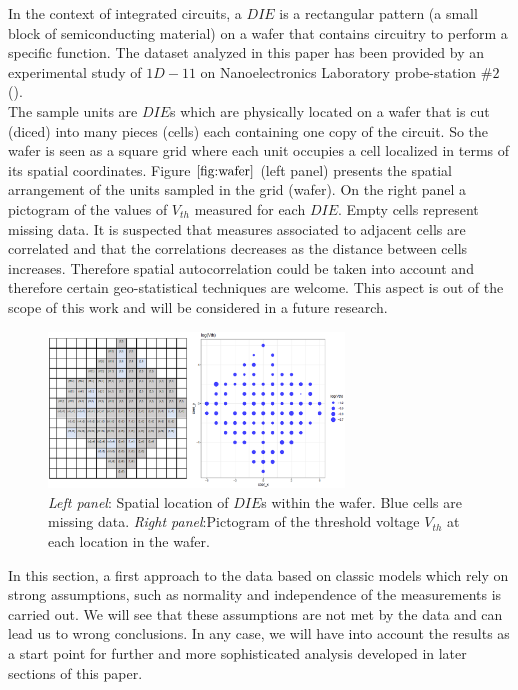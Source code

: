 \documentclass[sn-mathphys]{sn-jnl}%
\theoremstyle{thmstyleone}%
\theoremstyle{thmstyletwo}%
\theoremstyle{thmstylethree}%
\begin{document}
In the context of integrated circuits, a $DIE$ is a rectangular pattern (a small block of semiconducting material) on a wafer that contains circuitry to perform a specific function.  
The dataset analyzed in this paper has been provided by an experimental study of { } {$1D-11$} on Nanoelectronics Laboratory probe-station $\# 2$ ({}). \\
The sample units are $DIE$s which are physically  located on a wafer that is cut (diced) into many pieces (cells) each containing one copy of the circuit. So the wafer is seen as a square grid where each unit occupies a cell localized in terms of its spatial coordinates. 
Figure $\ref{fig:wafer}$ (left panel) presents the spatial arrangement of the units sampled in the grid (wafer). On the right panel a pictogram of the values of $V_{th}$ measured for each $DIE$. Empty cells represent missing data.
It is suspected that measures associated to  adjacent cells are correlated and that the correlations decreases as the distance between cells increases. Therefore spatial autocorrelation could be taken into account and therefore certain geo-statistical techniques are welcome. This aspect is out of the scope of this work and will be considered in a future research.%
\begin{figure}[ht]
	\centering
		\includegraphics[width=0.7\textwidth]{Fig1_wafer2.eps}
	\caption{{\it Left panel}: Spatial location of $DIE$s within the wafer. Blue cells are missing data. {\it Right panel}:Pictogram of the threshold voltage $V_{th}$ at each location in the wafer.}
	\label{fig:wafer}
\end{figure}



In this section, a first approach to the data based on classic models which rely on strong assumptions, such as normality and independence of the measurements is carried out. We will see that these assumptions are not met by the data and can lead us to wrong conclusions. In any case, we will have into account the results as a start point for further and more sophisticated analysis developed in later sections of this paper.
\end{document}
